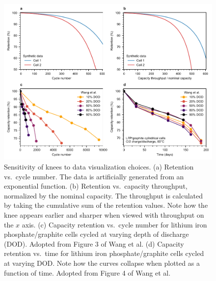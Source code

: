 \documentclass[journal=jpclcd,manuscript=article]{achemso}
\begin{document}
\begin{figure}[!ht]
\centering
\includegraphics[scale=1]{final_figures/x_axis_sensitivity.pdf}
\caption{Sensitivity of knees to data visualization choices.
(a) Retention vs.~cycle number. The data is artificially generated from an exponential function. 
(b) Retention vs.~capacity throughput, normalized by the nominal capacity. The throughput is calculated by taking the cumulative sum of the retention values.
Note how the knee appears earlier and sharper when viewed with throughput on the $x$ axis.
(c) Capacity retention vs.~cycle number for lithium iron phosphate/graphite cells cycled at varying depth of discharge (DOD). Adopted from Figure 3 of Wang et al.\cite{wang_cycle-life_2011}
(d) Capacity retention vs.~time for lithium iron phosphate/graphite cells cycled at varying DOD.
Note how the curves collapse when plotted as a function of time.
Adopted from Figure 4 of Wang et al.\cite{wang_cycle-life_2011}
}
\label{fig:x_axis}
\end{figure}
\end{document}
